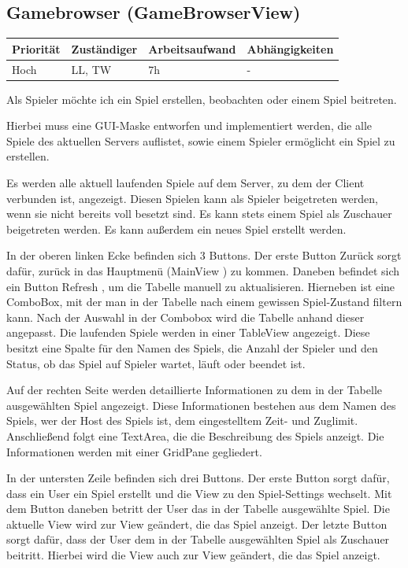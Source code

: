 \documentclass[a4paper]{scrreprt}
\newenvironment{requirement}[5] {
	\subsection{#1}
	\begin{tabularx}{\textwidth}{|X|l|X|X|}
		\hline
		Priorität & Zuständiger & Arbeitsaufwand & Abhängigkeiten \\
		\hline
		#2 & #3 & #4 & #5 \\
		\hline
	\end{tabularx}
	}{
	\newpage
	}
\begin{document}
\begin{requirement}{Gamebrowser (GameBrowserView)}{Hoch}{LL, TW}{7h}{-}

\begin{center}
	Als Spieler möchte ich ein Spiel erstellen, beobachten oder einem Spiel beitreten.
\end{center}

Hierbei muss eine GUI-Maske entworfen und implementiert werden, die alle Spiele des aktuellen Servers auflistet, sowie einem Spieler ermöglicht ein Spiel zu erstellen.

Es werden alle aktuell laufenden Spiele auf dem Server, zu dem der Client verbunden ist, angezeigt. Diesen Spielen kann als Spieler beigetreten werden, wenn sie nicht bereits voll besetzt sind. Es kann stets einem Spiel als Zuschauer beigetreten werden. Es kann außerdem ein neues Spiel erstellt werden.

In der oberen linken Ecke befinden sich 3 Buttons. Der erste Button \glqq Zurück \grqq{} sorgt dafür, zurück in das Hauptmenü (\glqq MainView \grqq{}) zu kommen.
Daneben befindet sich ein Button \glqq Refresh \grqq{}, um die Tabelle manuell zu aktualisieren.
Hierneben ist eine ComboBox, mit der man in der Tabelle nach einem gewissen Spiel-Zustand filtern kann. Nach der Auswahl in der Combobox wird die Tabelle anhand dieser angepasst.
Die laufenden Spiele werden in einer TableView angezeigt. Diese besitzt eine Spalte für den Namen des Spiels, die Anzahl der Spieler und den Status, ob das Spiel auf Spieler wartet, läuft oder beendet ist.

Auf der rechten Seite werden detaillierte Informationen zu dem in der Tabelle ausgewählten Spiel angezeigt. Diese Informationen bestehen aus dem Namen des Spiels, wer der Host des Spiels ist, dem eingestelltem Zeit- und Zuglimit. Anschließend folgt eine TextArea, die die Beschreibung des Spiels anzeigt.
Die Informationen werden mit einer GridPane gegliedert.

In der untersten Zeile befinden sich drei Buttons.
Der erste Button sorgt dafür, dass ein User ein Spiel erstellt und die View zu den Spiel-Settings wechselt.
Mit dem Button daneben betritt der User das in der Tabelle ausgewählte Spiel. Die aktuelle View wird zur View geändert, die das Spiel anzeigt.
Der letzte Button sorgt dafür, dass der User dem in der Tabelle ausgewählten Spiel als Zuschauer beitritt. Hierbei wird die View auch zur View geändert, die das Spiel anzeigt.


\end{requirement}
\end{document}
